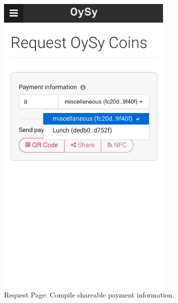 \begin{figure}
\centering
\includegraphics[width=0.75\textwidth]{screenshots/Request-1.png}
\caption{\label{fig:uirequest1}Request Page: Compile shareable payment information.}
\end{figure}

